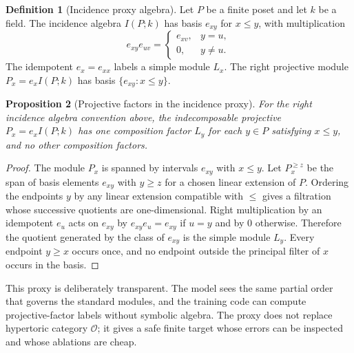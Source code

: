 \documentclass[11pt]{article}
\theoremstyle{definition}
\newtheorem{definition}{Definition}[section]
\theoremstyle{plain}
\newtheorem{proposition}[definition]{Proposition}
\theoremstyle{remark}
\numberwithin{equation}{section}
\begin{document}
\begin{definition}[Incidence proxy algebra]\label{def:incidence-proxy}
Let $P$ be a finite poset and let $k$ be a field.  The incidence algebra $I(P;k)$ has basis $e_{xy}$ for $x\leq y$, with multiplication
\begin{equation}
  e_{xy}e_{uv}=\begin{cases}
    e_{xv}, & y=u,\\
    0, & y\ne u.
  \end{cases}
\end{equation}
The idempotent $e_x=e_{xx}$ labels a simple module $L_x$.  The right projective module $P_x=e_xI(P;k)$ has basis $\{e_{xy}:x\le y\}$.
\end{definition}

\begin{proposition}[Projective factors in the incidence proxy]\label{prop:incidence-factors}
For the right incidence algebra convention above, the indecomposable projective $P_x=e_xI(P;k)$ has one composition factor $L_y$ for each $y\in P$ satisfying $x\le y$, and no other composition factors.
\end{proposition}

\begin{proof}
The module $P_x$ is spanned by intervals $e_{xy}$ with $x\le y$.  Let $P_x^{\ge z}$ be the span of basis elements $e_{xy}$ with $y\ge z$ for a chosen linear extension of $P$.  Ordering the endpoints $y$ by any linear extension compatible with $\leq$ gives a filtration whose successive quotients are one-dimensional.  Right multiplication by an idempotent $e_u$ acts on $e_{xy}$ by $e_{xy}e_u=e_{xy}$ if $u=y$ and by $0$ otherwise.  Therefore the quotient generated by the class of $e_{xy}$ is the simple module $L_y$.  Every endpoint $y\ge x$ occurs once, and no endpoint outside the principal filter of $x$ occurs in the basis.
\end{proof}

This proxy is deliberately transparent.  The model sees the same partial order that governs the standard modules, and the training code can compute projective-factor labels without symbolic algebra.  The proxy does not replace hypertoric category $\mathcal O$; it gives a safe finite target whose errors can be inspected and whose ablations are cheap.
\end{document}
